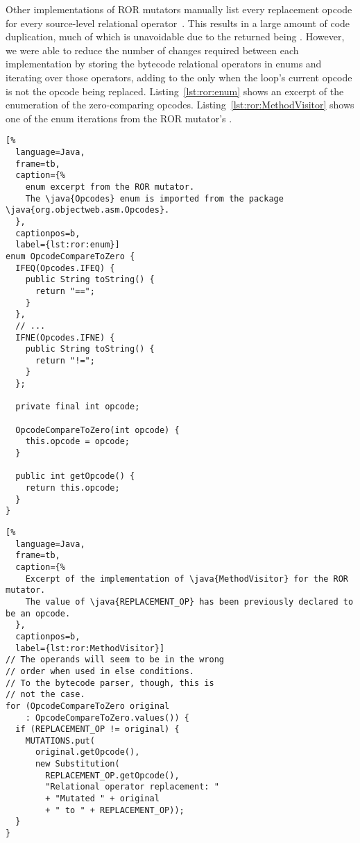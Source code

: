 Other implementations of ROR mutators manually list every replacement opcode for every source-level relational operator~\cite{ProdigyXable}.
This results in a large amount of code duplication, much of which is unavoidable due to the  returned being .
However, we were able to reduce the number of changes required between each implementation by storing the bytecode relational operators in enums and iterating over those operators, adding to the  only when the loop's current opcode is not the opcode being replaced.
Listing~\ref{lst:ror:enum} shows an excerpt of the enumeration of the zero-comparing opcodes.
Listing~\ref{lst:ror:MethodVisitor} shows one of the enum iterations from the ROR mutator's .

\begin{lstlisting}[%
  language=Java,
  frame=tb,
  caption={%
    enum excerpt from the ROR mutator.
    The \java{Opcodes} enum is imported from the package \java{org.objectweb.asm.Opcodes}.
  },
  captionpos=b,
  label={lst:ror:enum}]
enum OpcodeCompareToZero {
  IFEQ(Opcodes.IFEQ) {
    public String toString() {
      return "==";
    }
  },
  // ...
  IFNE(Opcodes.IFNE) {
    public String toString() {
      return "!=";
    }
  };

  private final int opcode;

  OpcodeCompareToZero(int opcode) {
    this.opcode = opcode;
  }

  public int getOpcode() {
    return this.opcode;
  }
}
\end{lstlisting}

\begin{lstlisting}[%
  language=Java,
  frame=tb,
  caption={%
    Excerpt of the implementation of \java{MethodVisitor} for the ROR mutator.
    The value of \java{REPLACEMENT_OP} has been previously declared to be an opcode.
  },
  captionpos=b,
  label={lst:ror:MethodVisitor}]
// The operands will seem to be in the wrong
// order when used in else conditions.
// To the bytecode parser, though, this is
// not the case.
for (OpcodeCompareToZero original
    : OpcodeCompareToZero.values()) {
  if (REPLACEMENT_OP != original) {
    MUTATIONS.put(
      original.getOpcode(),
      new Substitution(
        REPLACEMENT_OP.getOpcode(),
        "Relational operator replacement: "
        + "Mutated " + original
        + " to " + REPLACEMENT_OP));
  }
}
\end{lstlisting}
